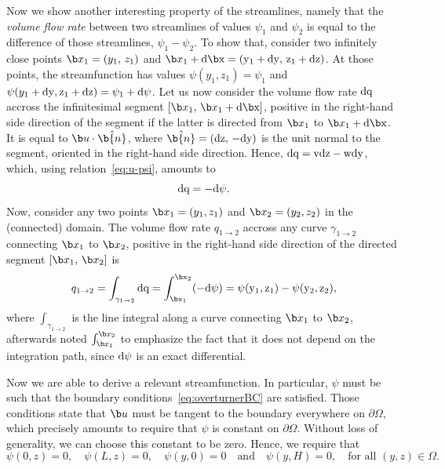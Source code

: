 \begin{tcolorbox}[title=Some properties of the streamfunction]
Now we show another interesting property of the streamlines, namely that the \textit{volume flow rate} between two streamlines of values $\psi_1$ and $\psi_2$ is equal to the difference of those streamlines, $\psi_1 - \psi_2$. To show that, consider two infinitely close points $\b x_1 = (y_1,\, z_1)$ and $\b x_1 + \rm d \b x = (y_1 + \rm dy,\, z_1 + \rm dz)$. At those points, the streamfunction has values $\psi(y_1,z_1) = \psi_1$ and $\psi(y_1+\rm dy,z_1 + \rm dz) = \psi_1 + \rm d\psi$. Let us now consider the volume flow rate $\rm dq$ accross the infinitesimal segment $[\b x_1,\, \b x_1 + \rm d \b x]$, positive in the right-hand side direction of the segment if the latter is directed from $\b x_1$ to $\b x_1 + \rm d \b x$. It is equal to $\b u \cdot \hat{\b{n}}$, where $\hat{\b{n}} = (\rm dz,\,-\rm dy)$ is the unit normal to the segment, oriented in the right-hand side direction. Hence, $\rm dq = v \rm dz - w \rm dy$, which, using relation~\eqref{eq:u-psi}, amounts to
\begin{equation}
	\rm dq = - \rm d\psi.
\end{equation}
Now, consider any two points $\b x_1 = (y_1, z_1)$ and $\b x_2 = (y_2, z_2)$ in the (connected) domain. The volume flow rate $q_{1 \rightarrow 2}$ accross any curve $\gamma_{1 \rightarrow 2}$ connecting $\b x_1$ to $\b x_2$, positive in the right-hand side direction of the directed segment $[\b x_1,\, \b x_2]$ is
\begin{equation}
	q_{1 \rightarrow 2} = \int_{\gamma_{1 \rightarrow 2}} \rm dq = \int_{\b x_1}^{\b x_2} (-\rm d\psi) = \psi(y_1,z_1) - \psi(y_2,z_2), 	
\end{equation} 
where $\int_{\gamma_{1 \rightarrow 2}}$ is the line integral along a curve connecting $\b x_1$ to $\b x_2$, afterwards noted $\int_{\b x_1}^{\b x_2}$ to emphasize the fact that it does not depend on the integration path, since $\rm d\psi$ is an exact differential.
\end{tcolorbox}
Now we are able to derive a relevant streamfunction. In particular, $\psi$ must be such that the boundary conditions~\eqref{eq:overturnerBC} are satisfied. Those conditions state that $\b u$ must be tangent to the boundary everywhere on $\partial \Omega$, which precisely amounts to require that $\psi$ is constant on $\partial \Omega$. Without loss of generality, we can choose this constant to be zero. Hence, we require that 
\begin{equation}
	\psi(0,z) = 0, \quad \psi(L,z) = 0, \quad \psi(y,0) = 0 \quad \mbox{and} \quad \psi(y,H) = 0, \quad \mbox{for all $(y,z) \in \Omega$}.
\end{equation}
